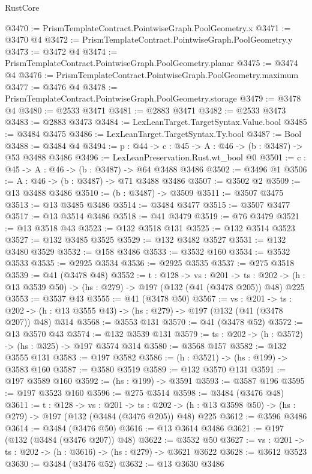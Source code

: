 \begin{lexlean}{RustCore}
\begin{coremodule}
@3470 := PrismTemplateContract.PointwiseGraph.PoolGeometry.x
@3471 := @3470 @4
@3472 := PrismTemplateContract.PointwiseGraph.PoolGeometry.y
@3473 := @3472 @4
@3474 := PrismTemplateContract.PointwiseGraph.PoolGeometry.planar
@3475 := @3474 @4
@3476 := PrismTemplateContract.PointwiseGraph.PoolGeometry.maximum
@3477 := @3476 @4
@3478 := PrismTemplateContract.PointwiseGraph.PoolGeometry.storage
@3479 := @3478 @4
@3480 := @2533 @3471
@3481 := @2883 @3471
@3482 := @2533 @3473
@3483 := @2883 @3473
@3484 := LexLeanTarget.TargetSyntax.Value.bool
@3485 := @3484 @3475
@3486 := LexLeanTarget.TargetSyntax.Ty.bool
@3487 := Bool
@3488 := @3484 @4
@3494 := {p : @44} -> {c : @45} -> {A : @46} -> (b : @3487) -> @53 @3488 @3486
@3496 := LexLeanPreservation.Rust.wt_bool @0
@3501 := {c : @45} -> {A : @46} -> (b : @3487) -> @64 @3488 @3486
@3502 := @3496 @1
@3506 := {A : @46} -> (b : @3487) -> @71 @3488 @3486
@3507 := @3502 @2
@3509 := @13 @3488 @3486
@3510 := (b : @3487) -> @3509
@3511 := @3507 @3475
@3513 := @13 @3485 @3486
@3514 := @3484 @3477
@3515 := @3507 @3477
@3517 := @13 @3514 @3486
@3518 := @41 @3479
@3519 := @76 @3479
@3521 := @13 @3518 @43
@3523 := @132 @3518 @131
@3525 := @132 @3514 @3523
@3527 := @132 @3485 @3525
@3529 := @132 @3482 @3527
@3531 := @132 @3480 @3529
@3532 := @158 @3486
@3533 := @3532 @160
@3534 := @3532 @3533
@3535 := @2925 @3534
@3536 := @2925 @3535
@3537 := @275 @3518
@3539 := @41 (@3478 @48)
@3552 := {t : @128} ->
  {vs : @201} ->
  {ts : @202} -> (h : @13 @3539 @50) -> (hs : @279) -> @197 (@132 (@41 (@3478 @205)) @48) @225
@3553 := @3537 @43
@3555 := @41 (@3478 @50)
@3567 := {vs : @201} ->
  {ts : @202} -> (h : @13 @3555 @43) -> (hs : @279) -> @197 (@132 (@41 (@3478 @207)) @48) @314
@3568 := @3553 @131
@3570 := @41 (@3478 @52)
@3572 := @13 @3570 @43
@3574 := @132 @3539 @131
@3579 := {ts : @202} -> (h : @3572) -> (hs : @325) -> @197 @3574 @314
@3580 := @3568 @157
@3582 := @132 @3555 @131
@3583 := @197 @3582
@3586 := (h : @3521) -> (hs : @199) -> @3583 @160
@3587 := @3580 @3519
@3589 := @132 @3570 @131
@3591 := @197 @3589 @160
@3592 := (hs : @199) -> @3591
@3593 := @3587 @196
@3595 := @197 @3523 @160
@3596 := @275 @3514
@3598 := @3484 (@3476 @48)
@3611 := {t : @128} ->
  {vs : @201} ->
  {ts : @202} -> (h : @13 @3598 @50) -> (hs : @279) -> @197 (@132 (@3484 (@3476 @205)) @48) @225
@3612 := @3596 @3486
@3614 := @3484 (@3476 @50)
@3616 := @13 @3614 @3486
@3621 := @197 (@132 (@3484 (@3476 @207)) @48)
@3622 := @3532 @50
@3627 := {vs : @201} -> {ts : @202} -> (h : @3616) -> (hs : @279) -> @3621 @3622
@3628 := @3612 @3523
@3630 := @3484 (@3476 @52)
@3632 := @13 @3630 @3486

\end{coremodule}
\end{lexlean}
